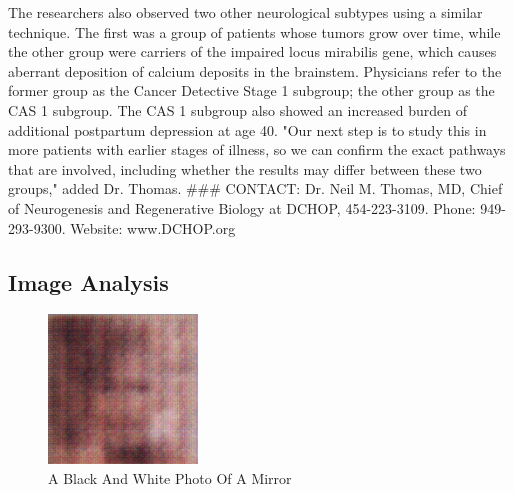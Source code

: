 \documentclass{article}%
\begin{document}
The researchers also observed two other neurological subtypes using a similar technique. The first was a group of patients whose tumors grow over time, while the other group were carriers of the impaired locus mirabilis gene, which causes aberrant deposition of calcium deposits in the brainstem. Physicians refer to the former group as the Cancer Detective Stage 1 subgroup; the other group as the CAS 1 subgroup. The CAS 1 subgroup also showed an increased burden of additional postpartum depression at age 40.\newline%
"Our next step is to study this in more patients with earlier stages of illness, so we can confirm the exact pathways that are involved, including whether the results may differ between these two groups," added Dr. Thomas.\newline%
\#\#\#\newline%
CONTACT: Dr. Neil M. Thomas, MD, Chief of Neurogenesis and Regenerative Biology at DCHOP, 454{-}223{-}3109. Phone: 949{-}293{-}9300. Website: www.DCHOP.org

%
\subsection{Image Analysis}%
\label{subsec:ImageAnalysis}%


\begin{figure}[h!]%
\centering%
\includegraphics[width=150px]{500_fake_images/samples_5_374.png}%
\caption{A Black And White Photo Of A Mirror}%
\end{figure}

%
\end{document}
